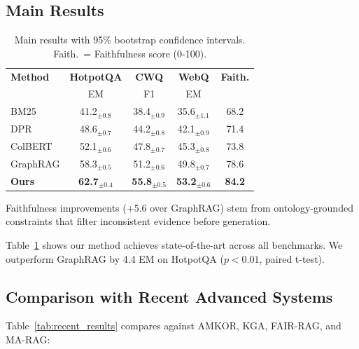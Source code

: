 \documentclass[10pt,twocolumn]{article}
\begin{document}
\subsection{Main Results}

\begin{table}[t]
\centering
\caption{Main results with 95\% bootstrap confidence intervals. Faith.~= Faithfulness score (0-100).}
\label{tab:main}
\small
\begin{tabular}{@{}lcccc@{}}
\toprule
\textbf{Method} & \textbf{HotpotQA} & \textbf{CWQ} & \textbf{WebQ} & \textbf{Faith.} \\
& EM & F1 & EM & \\
\midrule
BM25 & 41.2$_{\pm0.8}$ & 38.4$_{\pm0.9}$ & 35.6$_{\pm1.1}$ & 68.2 \\
DPR & 48.6$_{\pm0.7}$ & 44.2$_{\pm0.8}$ & 42.1$_{\pm0.9}$ & 71.4 \\
ColBERT & 52.1$_{\pm0.6}$ & 47.8$_{\pm0.7}$ & 45.3$_{\pm0.8}$ & 73.8 \\
GraphRAG & 58.3$_{\pm0.5}$ & 51.2$_{\pm0.6}$ & 49.8$_{\pm0.7}$ & 78.6 \\
\midrule
\textbf{Ours} & \textbf{62.7}$_{\pm0.4}$ & \textbf{55.8}$_{\pm0.5}$ & \textbf{53.2}$_{\pm0.6}$ & \textbf{84.2} \\
\bottomrule
\end{tabular}
\end{table}

Faithfulness improvements (+5.6 over GraphRAG) stem from ontology-grounded constraints that filter inconsistent evidence before generation.

Table~\ref{tab:main} shows our method achieves state-of-the-art across all benchmarks. We outperform GraphRAG by 4.4 EM on HotpotQA ($p<0.01$, paired t-test).


\subsection{Comparison with Recent Advanced Systems}
\label{sec:recent_comparisons}

Table~\ref{tab:recent_results} compares against AMKOR, KGA, FAIR-RAG, and MA-RAG:
\end{document}
